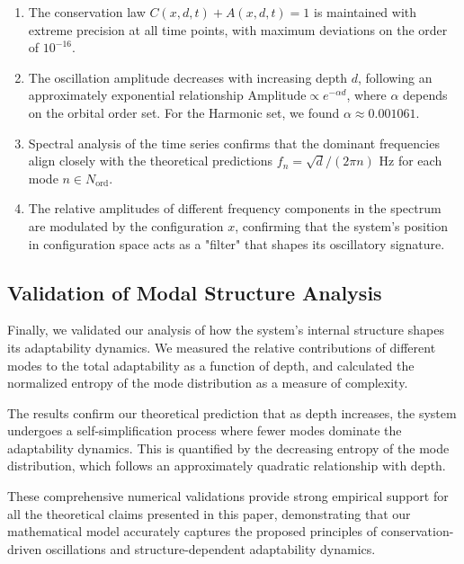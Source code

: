 \documentclass[11pt,a4paper]{article}
\begin{document}
\begin{enumerate}
    \item The conservation law $C(x,d,t) + A(x,d,t) = 1$ is maintained with extreme precision at all time points, with maximum deviations on the order of $10^{-16}$.

    \item The oscillation amplitude decreases with increasing depth $d$, following an approximately exponential relationship $\text{Amplitude} \propto e^{-\alpha d}$, where $\alpha$ depends on the orbital order set. For the Harmonic set, we found $\alpha \approx 0.001061$.

    \item Spectral analysis of the time series confirms that the dominant frequencies align closely with the theoretical predictions $f_n = \sqrt{d}/(2\pi n)$ Hz for each mode $n \in N_{\text{ord}}$.

    \item The relative amplitudes of different frequency components in the spectrum are modulated by the configuration $x$, confirming that the system's position in configuration space acts as a "filter" that shapes its oscillatory signature.
\end{enumerate}

\subsection{Validation of Modal Structure Analysis}

Finally, we validated our analysis of how the system's internal structure shapes its adaptability dynamics. We measured the relative contributions of different modes to the total adaptability as a function of depth, and calculated the normalized entropy of the mode distribution as a measure of complexity.

The results confirm our theoretical prediction that as depth increases, the system undergoes a self-simplification process where fewer modes dominate the adaptability dynamics. This is quantified by the decreasing entropy of the mode distribution, which follows an approximately quadratic relationship with depth.

These comprehensive numerical validations provide strong empirical support for all the theoretical claims presented in this paper, demonstrating that our mathematical model accurately captures the proposed principles of conservation-driven oscillations and structure-dependent adaptability dynamics.
\end{document}

